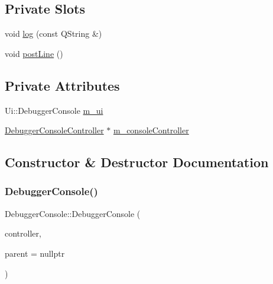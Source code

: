 \subsection*{Private Slots}
\begin{DoxyCompactItemize}
\item 
void \mbox{\hyperlink{class_q_g_b_a_1_1_debugger_console_a8a855b6d7d76cc5bed317e80ea9517e4}{log}} (const Q\+String \&)
\item 
void \mbox{\hyperlink{class_q_g_b_a_1_1_debugger_console_a6364d65b410dd27638c5efc20fcb1559}{post\+Line}} ()
\end{DoxyCompactItemize}
\subsection*{Private Attributes}
\begin{DoxyCompactItemize}
\item 
Ui\+::\+Debugger\+Console \mbox{\hyperlink{class_q_g_b_a_1_1_debugger_console_a0f2bd4c41069b346a22829e118e53570}{m\+\_\+ui}}
\item 
\mbox{\hyperlink{class_q_g_b_a_1_1_debugger_console_controller}{Debugger\+Console\+Controller}} $\ast$ \mbox{\hyperlink{class_q_g_b_a_1_1_debugger_console_a305eb9fc67054eeb8205d43cd744f2b5}{m\+\_\+console\+Controller}}
\end{DoxyCompactItemize}


\subsection{Constructor \& Destructor Documentation}
\mbox{\label{class_q_g_b_a_1_1_debugger_console_a2a21572e0ebb866fbffac35f3832794a}} 
\subsubsection{\texorpdfstring{Debugger\+Console()}{DebuggerConsole()}}
{\footnotesize\ttfamily Debugger\+Console\+::\+Debugger\+Console (\begin{DoxyParamCaption}\item[{\mbox{\hyperlink{class_q_g_b_a_1_1_debugger_console_controller}{Debugger\+Console\+Controller}} $\ast$}]{controller,  }\item[{Q\+Widget $\ast$}]{parent = {\ttfamily nullptr} }\end{DoxyParamCaption})}


